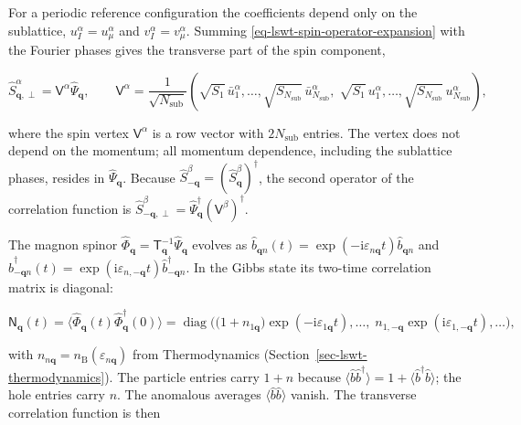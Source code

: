 For a periodic reference configuration the coefficients depend only on the sublattice, \(u_I^\alpha=u_\mu^\alpha\) and \(v_I^\alpha=v_\mu^\alpha\). Summing \eqref{eq-lswt-spin-operator-expansion} with the Fourier phases gives the transverse part of the spin component,

\begin{equation}\label{eq-lswt-spin-vertex}
\hat S_{\mathbf q,\perp}^\alpha=\mathsf V^\alpha\hat\Psi_{\mathbf q},
\qquad
\mathsf V^\alpha=\frac{1}{\sqrt{N_{\mathrm{sub}}}}
\left(\sqrt{S_1}\,\bar u_1^\alpha,\ldots,\sqrt{S_{N_{\mathrm{sub}}}}\,\bar u_{N_{\mathrm{sub}}}^\alpha,\;
\sqrt{S_1}\,u_1^\alpha,\ldots,\sqrt{S_{N_{\mathrm{sub}}}}\,u_{N_{\mathrm{sub}}}^\alpha\right),
\end{equation}

where the spin vertex \(\mathsf V^\alpha\) is a row vector with \(2N_{\mathrm{sub}}\) entries. The vertex does not depend on the momentum; all momentum dependence, including the sublattice phases, resides in \(\hat\Psi_{\mathbf q}\). Because \(\hat S_{-\mathbf q}^\beta=(\hat S_{\mathbf q}^\beta)^\dagger\), the second operator of the correlation function is \(\hat S_{-\mathbf q,\perp}^\beta=\hat\Psi_{\mathbf q}^\dagger(\mathsf V^\beta)^\dagger\).

The magnon spinor \(\hat\Phi_{\mathbf q}=\mathsf T_{\mathbf q}^{-1}\hat\Psi_{\mathbf q}\) evolves as \(\hat b_{\mathbf qn}(t)=\exp(-\mathrm i\varepsilon_{n\mathbf q}t)\hat b_{\mathbf qn}\) and \(\hat b_{-\mathbf qn}^\dagger(t)=\exp(\mathrm i\varepsilon_{n,-\mathbf q}t)\hat b_{-\mathbf qn}^\dagger\). In the Gibbs state its two-time correlation matrix is diagonal:

\begin{equation}\label{eq-lswt-magnon-correlation-matrix}
\mathsf N_{\mathbf q}(t)
=\big\langle\hat\Phi_{\mathbf q}(t)\hat\Phi_{\mathbf q}^\dagger(0)\big\rangle
=\operatorname{diag}\!\Big(\big(1+n_{1\mathbf q}\big)\exp(-\mathrm i\varepsilon_{1\mathbf q}t),\ldots,\;
n_{1,-\mathbf q}\exp(\mathrm i\varepsilon_{1,-\mathbf q}t),\ldots\Big),
\end{equation}

with \(n_{n\mathbf q}=n_{\mathrm B}(\varepsilon_{n\mathbf q})\) from Thermodynamics (Section~\ref{sec-lswt-thermodynamics}). The particle entries carry \(1+n\) because \(\langle\hat b\hat b^\dagger\rangle=1+\langle\hat b^\dagger\hat b\rangle\); the hole entries carry \(n\). The anomalous averages \(\langle\hat b\hat b\rangle\) vanish. The transverse correlation function is then

